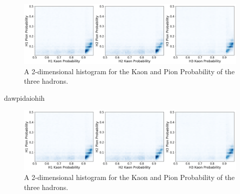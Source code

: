  \begin{figure}
  \centering
  \includegraphics[width = .95\textwidth]{"content/pics/ProbKPi.png"}

  \caption{A 2-dimensional histogram for the Kaon and Pion Probability of the three hadrons.}
  \label{fig:ProbKPi}
\end{figure}
dawpidaiohih
\begin{figure}
  \centering
  \includegraphics[width = .95\textwidth]{"content/pics/ProbKPi.png"}

  \caption{A 2-dimensional histogram for the Kaon and Pion Probability of the three hadrons.}
  \label{fig:ProbKPi}
\end{figure}